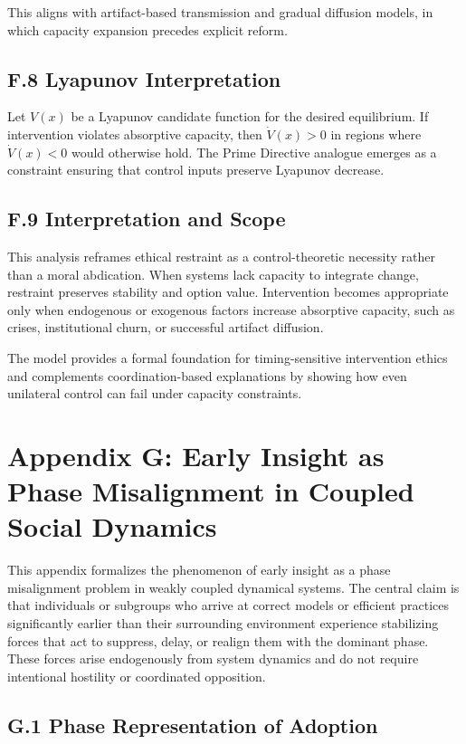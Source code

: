 \documentclass[11pt]{article}
\begin{document}
This aligns with artifact-based transmission and gradual diffusion models, in which capacity expansion precedes explicit reform.

\subsection{F.8 Lyapunov Interpretation}

Let \(V(x)\) be a Lyapunov candidate function for the desired equilibrium. If intervention violates absorptive capacity, then \(\dot{V}(x) > 0\) in regions where \(\dot{V}(x) < 0\) would otherwise hold. The Prime Directive analogue emerges as a constraint ensuring that control inputs preserve Lyapunov decrease.

\subsection{F.9 Interpretation and Scope}

This analysis reframes ethical restraint as a control-theoretic necessity rather than a moral abdication. When systems lack capacity to integrate change, restraint preserves stability and option value. Intervention becomes appropriate only when endogenous or exogenous factors increase absorptive capacity, such as crises, institutional churn, or successful artifact diffusion.

The model provides a formal foundation for timing-sensitive intervention ethics and complements coordination-based explanations by showing how even unilateral control can fail under capacity constraints.

\section{Appendix G: Early Insight as Phase Misalignment in Coupled Social Dynamics}
\label{app:phase-detailed}

This appendix formalizes the phenomenon of early insight as a phase misalignment problem in weakly coupled dynamical systems. The central claim is that individuals or subgroups who arrive at correct models or efficient practices significantly earlier than their surrounding environment experience stabilizing forces that act to suppress, delay, or realign them with the dominant phase. These forces arise endogenously from system dynamics and do not require intentional hostility or coordinated opposition.

\subsection{G.1 Phase Representation of Adoption}
\end{document}
